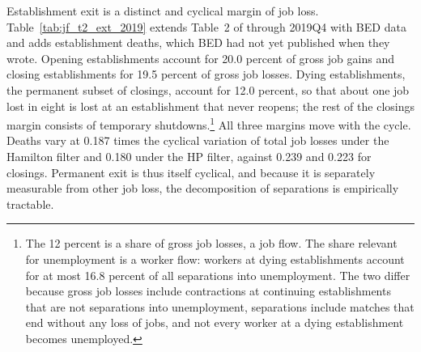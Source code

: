 \documentclass[authoryear, review, 12pt]{elsarticle}
\begin{document}
Establishment exit is a distinct and cyclical margin of job loss. Table~\ref{tab:jf_t2_ext_2019} extends Table~2 of \citet{jaimovich_2008} through 2019Q4 with BED data and adds establishment deaths, which BED had not yet published when they wrote.
Opening establishments account for 20.0 percent of gross job gains and closing establishments for 19.5 percent of gross job losses. Dying establishments, the permanent subset of closings, account for 12.0 percent, so that about one job lost in eight is lost at an establishment that never reopens; the rest of the closings margin consists of temporary shutdowns.\footnote{The 12 percent is a share of gross job losses, a job flow. The share relevant for unemployment is a worker flow: workers at dying establishments account for at most 16.8 percent of all separations into unemployment. The two differ because gross job losses include contractions at continuing establishments that are not separations into unemployment, separations include matches that end without any loss of jobs, and not every worker at a dying establishment becomes unemployed.}
All three margins move with the cycle. Deaths vary at 0.187 times the cyclical variation of total job losses under the Hamilton filter and 0.180 under the HP filter, against 0.239 and 0.223 for closings. Permanent exit is thus itself cyclical, and because it is separately measurable from other job loss, the decomposition of separations is empirically tractable.
\end{document}
